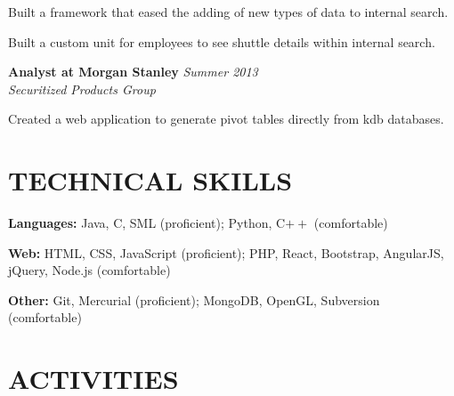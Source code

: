 \documentclass[margin, 11pt]{res} %
\begin{document}
\begin{resume}
\begin{itemize} \itemsep -2pt
{\small
\item Built a framework that eased the adding of new types of data to internal search.
\item Built a custom unit for employees to see shuttle details within internal search.
}
\end{itemize}

\vspace{3pt}

{\bf Analyst at Morgan Stanley} \hfill {\sl Summer 2013} \\
{\sl Securitized Products Group}
\begin{itemize} \itemsep -2pt %
{\small
\item Created a web application to generate pivot tables directly from kdb databases.
}
\end{itemize}


\section{TECHNICAL SKILLS}

{\bf Languages:}
Java, C, SML (proficient); Python, C$++$ (comfortable)

\vspace{5pt}

{\bf Web:}
HTML, CSS, JavaScript (proficient); PHP, React, Bootstrap, AngularJS, jQuery, Node.js (comfortable)

\vspace{5pt}

{\bf Other:}
Git, Mercurial (proficient); MongoDB, OpenGL, Subversion (comfortable)


\section{ACTIVITIES}


\end{resume}
\end{document}
